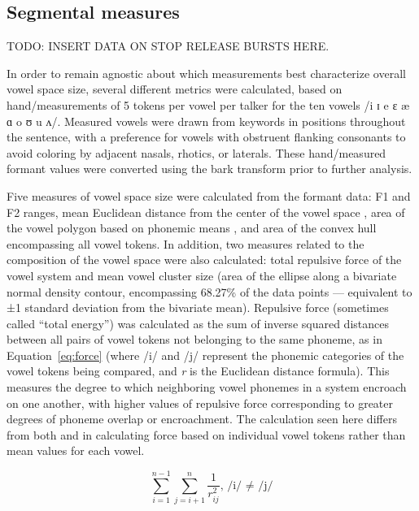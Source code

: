 \subsection{Segmental measures}
TODO: INSERT DATA ON STOP RELEASE BURSTS HERE.

In order to remain agnostic about which measurements best characterize overall vowel space size, several different metrics were calculated, based on hand\-/measurements of 5 tokens per vowel per talker for the ten vowels /i ɪ e ɛ æ ɑ o ʊ u ʌ/.  Measured vowels were drawn from keywords in positions throughout the sentence, with a preference for vowels with obstruent flanking consonants to avoid coloring by adjacent nasals, rhotics, or laterals.  These hand\-/measured formant values were converted using the bark transform \citep{bark} prior to further analysis.

Five measures of vowel space size were calculated from the formant data: F1 and F2 ranges, mean Euclidean distance from the center of the vowel space \citep[cf.][]{BradlowEtAl1996}, area of the vowel polygon based on phonemic means \citep[cf.][]{BradlowEtAl1996, Neel2008}, and area of the convex hull encompassing all vowel tokens.  In addition, two measures related to the composition of the vowel space were also calculated: total repulsive force of the vowel system \citep[cf.][]{LiljencrantsLindblom1972, Wright2004a} and mean vowel cluster size (area of the ellipse along a bivariate normal density contour, encompassing 68.27\% of the data points — equivalent to ±1 standard deviation from the bivariate mean).  Repulsive force (sometimes called “total energy”) was calculated as the sum of inverse squared distances between all pairs of vowel tokens not belonging to the same phoneme, as in Equation~\ref{eq:force} (where /i/ and /j/ represent the phonemic categories of the vowel tokens being compared, and \textit{r} is the Euclidean distance formula).  This measures the degree to which neighboring vowel phonemes in a system encroach on one another, with higher values of repulsive force corresponding to greater degrees of phoneme overlap or encroachment.  The calculation seen here differs from both \citealt{LiljencrantsLindblom1972} and \citealt{Wright2004a} in calculating force based on individual vowel tokens rather than mean values for each vowel.

\begin{equation}\label{eq:force}
	\sum_{i=1}^{n-1} \sum_{j=i+1}^{n} \frac{1}{r_{ij}^2} \text{, /i/ ≠ /j/}
\end{equation}

